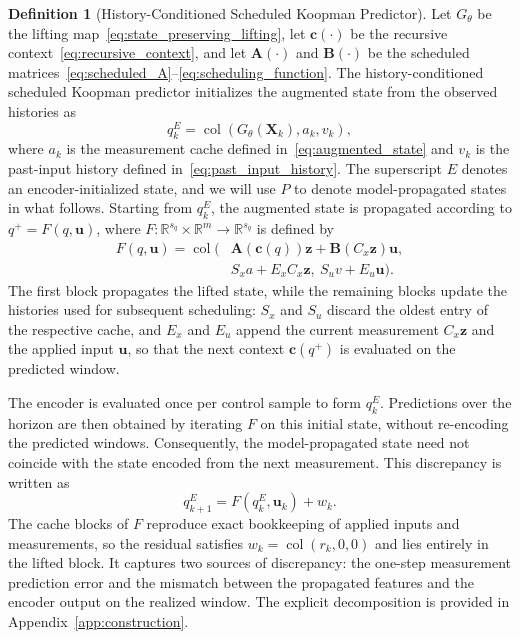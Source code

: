 \documentclass[journal]{IEEEtran}
\theoremstyle{plain}
\theoremstyle{definition}
\newtheorem{definition}{Definition}
\newcommand{\envend}{\leavevmode\unskip\penalty9999 \hbox{}\nobreak\hfill\quad\hbox{\IEEEQEDopen}}
\newcommand{\vu}{\mathbf{u}}
\newcommand{\vz}{\mathbf{z}}
\newcommand{\vc}{\mathbf{c}}
\newcommand{\mA}{\mathbf{A}}
\newcommand{\mB}{\mathbf{B}}
\newcommand{\mX}{\mathbf{X}}
\newcommand{\R}{\mathbb{R}}
\newcommand{\col}{\operatorname{col}}
\begin{document}
\begin{definition}[History-Conditioned Scheduled Koopman Predictor]
\label{def:history_scheduled_predictor}
Let $G_\theta$ be the lifting map~\eqref{eq:state_preserving_lifting}, let $\vc(\cdot)$ be the recursive context~\eqref{eq:recursive_context}, and let $\mA(\cdot)$ and $\mB(\cdot)$ be the scheduled matrices~\eqref{eq:scheduled_A}--\eqref{eq:scheduling_function}. The history-conditioned scheduled Koopman predictor initializes the augmented state from the observed histories as
\begin{equation}
q_k^E=\col(G_\theta(\mX_k),a_k,v_k),
\label{eq:encoded_initialization}
\end{equation}
where $a_k$ is the measurement cache defined in~\eqref{eq:augmented_state} and $v_k$ is the past-input history defined in~\eqref{eq:past_input_history}. The superscript $E$ denotes an encoder-initialized state, and we will use $P$ to denote model-propagated states in what follows. Starting from $q_k^E$, the augmented state is propagated according to $q^+=F(q,\vu)$, where $F:\R^{s_q}\times\R^m\to\R^{s_q}$ is defined by
\begin{equation}
\begin{aligned}
F(q,\vu)=\col\bigl(&\mA(\vc(q))\vz+\mB(C_x\vz)\vu,\\
&S_xa+E_xC_x\vz,\ S_uv+E_u\vu\bigr).
\end{aligned}
\label{eq:recursive_predictor}
\end{equation}
The first block propagates the lifted state, while the remaining blocks update the histories used for subsequent scheduling: $S_x$ and $S_u$ discard the oldest entry of the respective cache, and $E_x$ and $E_u$ append the current measurement $C_x\vz$ and the applied input $\vu$, so that the next context $\vc(q^+)$ is evaluated on the predicted window.\envend
\end{definition}

The encoder is evaluated once per control sample to form $q_k^E$. Predictions over the horizon are then obtained by iterating $F$ on this initial state, without re-encoding the predicted windows. Consequently, the model-propagated state need not coincide with the state encoded from the next measurement. This discrepancy is written as
\begin{equation}
q_{k+1}^E=F(q_k^E,\vu_k)+w_k.
\label{eq:reencoding_residual}
\end{equation}
The cache blocks of $F$ reproduce exact bookkeeping of applied inputs and measurements, so the residual satisfies $w_k=\col(r_k,0,0)$ and lies entirely in the lifted block. It captures two sources of discrepancy: the one-step measurement prediction error and the mismatch between the propagated features and the encoder output on the realized window. The explicit decomposition is provided in Appendix~\ref{app:construction}.
\end{document}
